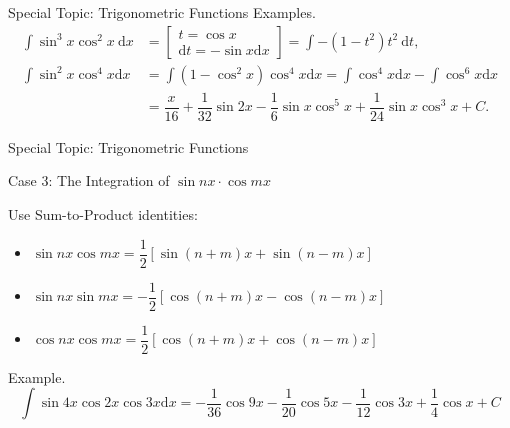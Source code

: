 \documentclass[aspectratio=169, UTF8]{ctexbeamer}
\begin{document}
    \begin{frame}[t]{Special Topic: Trigonometric Functions}
        \textcolor{yy}{Examples.}
        \begin{equation*}
            \begin{aligned}
                \int \sin^3 x\cos^2 x\ \mathrm{d}x &= \left[\begin{array}{c} t = \cos x \\ \mathrm{d}t = -\sin x \mathrm{d}x \end{array}\right] =\int -(1-t^2)t^2\ \mathrm{d}t, \\
                \int \sin ^{2} x \cos ^{4} x \mathrm{d}x & =\int (1-\cos^2 x)\cos ^{4} x \mathrm{d}x=\int \cos^4 x \mathrm{d}x-\int \cos^6 x \mathrm{d}x\\
                & = \dfrac{x}{16}+\dfrac{1}{32} \sin 2 x-\dfrac{1}{6} \sin x \cos ^{5}x+\dfrac{1}{24} \sin x \cos ^{3}x+C.
            \end{aligned}
        \end{equation*}
    \end{frame}

    \begin{frame}[t]{Special Topic: Trigonometric Functions}
        \begin{block}{Case 3: The Integration of $\sin nx \cdot \cos mx$}
            \par Use Sum-to-Product identities:
            \begin{itemize}
                \item $\sin nx\cos mx=\dfrac{1}{2}[\sin(n+m)x+\sin(n-m)x]$
                \item $\sin nx\sin mx={-}\dfrac{1}{2}[\cos(n+m)x-\cos(n-m)x]$
                \item $\cos nx\cos mx=\dfrac{1}{2}[\cos(n+m)x+\cos(n-m)x]$
            \end{itemize}
        \end{block}
        \par \textcolor{yy}{Example.} $$\int \sin 4 x \cos 2 x \cos 3 x \mathrm{d}x = -\dfrac{1}{36} \cos 9 x-\dfrac{1}{20} \cos 5 x-\dfrac{1}{12} \cos 3 x+\dfrac{1}{4} \cos x+C$$
    \end{frame}
\end{document}
